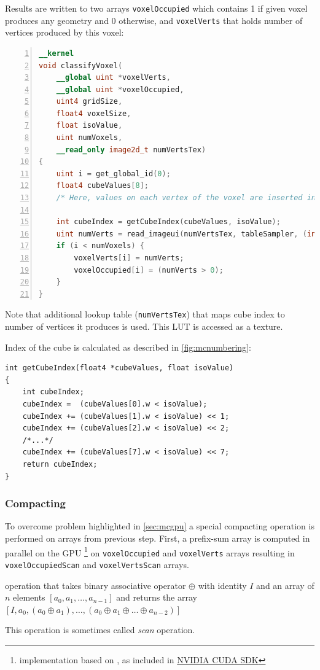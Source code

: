 Results are written to two arrays \texttt{voxelOccupied} which contains 1
if given voxel produces any geometry and 0 otherwise, and
\texttt{voxelVerts} that holds number of vertices produced by this voxel:
\begin{lstlisting}[language=opencl, numbers=left]
__kernel
void classifyVoxel(
	__global uint *voxelVerts,
	__global uint *voxelOccupied,
	uint4 gridSize,
	float4 voxelSize,
	float isoValue,
	uint numVoxels,
	__read_only image2d_t numVertsTex)
{
	uint i = get_global_id(0);
	float4 cubeValues[8];
	/* Here, values on each vertex of the voxel are inserted into cubeValues array */

	int cubeIndex = getCubeIndex(cubeValues, isoValue);
	uint numVerts = read_imageui(numVertsTex, tableSampler, (int2)(cubeIndex, 0)).x;
	if (i < numVoxels) {
		voxelVerts[i] = numVerts;
		voxelOccupied[i] = (numVerts > 0);
	}
}
\end{lstlisting}
Note that additional lookup table (\texttt{numVertsTex}) that maps cube index to
number of vertices it produces is used. This LUT is accessed as a texture.

Index of the cube is calculated as described in \autoref{fig:mcnumbering}:

\begin{lstlisting}
int getCubeIndex(float4 *cubeValues, float isoValue)
{
	int cubeIndex;
	cubeIndex =  (cubeValues[0].w < isoValue);
	cubeIndex += (cubeValues[1].w < isoValue) << 1;
	cubeIndex += (cubeValues[2].w < isoValue) << 2;
	/*...*/
	cubeIndex += (cubeValues[7].w < isoValue) << 7;
	return cubeIndex;
}
\end{lstlisting}

\subsubsection{Compacting}
To overcome problem highlighted in \autoref{sec:mcgpu} a special compacting
operation is performed on arrays from previous step. First, a prefix-sum array
is computed in parallel on the GPU \footnote{implementation based on \cite{gpugemsscan},
as included in \href{https://developer.nvidia.com/cuda-downloads}{NVIDIA CUDA SDK}}
on \texttt{voxelOccupied} and \texttt{voxelVerts} arrays resulting in
\texttt{voxelOccupiedScan} and \texttt{voxelVertsScan} arrays.

\begin{defn}
operation that takes binary associative operator $\oplus$ with identity $I$ and
an array of $n$ elements $[a_0,a_1,\ldots,a_{n-1}]$ and returns the array
$[I,a_0,(a_0\oplus a_1),\ldots,(a_0\oplus a_1 \oplus \ldots \oplus a_{n-2})]$

This operation is sometimes called \emph{scan} operation.
\end{defn}

